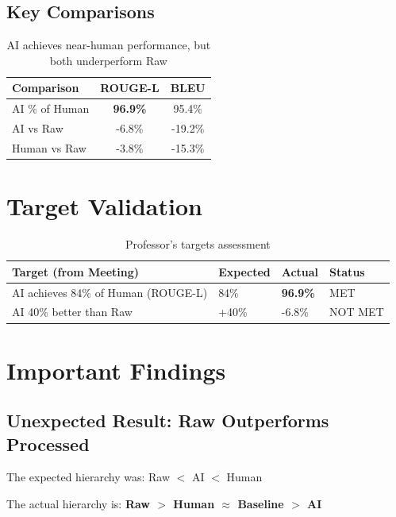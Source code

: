 \documentclass[11pt]{article}
\begin{document}
\subsection{Key Comparisons}

\begin{table}[h]
\centering
\begin{tabular}{@{}lcc@{}}
\toprule
\textbf{Comparison} & \textbf{ROUGE-L} & \textbf{BLEU} \\
\midrule
AI \% of Human & \cellcolor{green!20}\textbf{96.9\%} & 95.4\% \\
AI vs Raw & \cellcolor{red!20}-6.8\% & -19.2\% \\
Human vs Raw & \cellcolor{red!20}-3.8\% & -15.3\% \\
\bottomrule
\end{tabular}
\caption{AI achieves near-human performance, but both underperform Raw}
\end{table}

\section{Target Validation}

\begin{table}[h]
\centering
\begin{tabular}{@{}llll@{}}
\toprule
\textbf{Target (from Meeting)} & \textbf{Expected} & \textbf{Actual} & \textbf{Status} \\
\midrule
AI achieves 84\% of Human (ROUGE-L) & 84\% & \textbf{96.9\%} & \cellcolor{green!20}MET \\
AI 40\% better than Raw & +40\% & -6.8\% & \cellcolor{red!20}NOT MET \\
\bottomrule
\end{tabular}
\caption{Professor's targets assessment}
\end{table}

\section{Important Findings}

\subsection{Unexpected Result: Raw Outperforms Processed}

The expected hierarchy was: Raw $<$ AI $<$ Human

The actual hierarchy is: \textbf{Raw $>$ Human $\approx$ Baseline $>$ AI}
\end{document}
